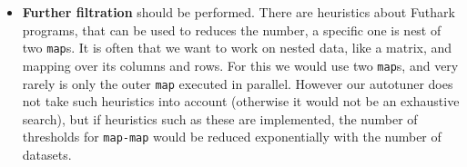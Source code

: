 \begin{itemize}
	\item \textbf{Further filtration} should be performed. There are heuristics
    about Futhark programs, that can be used to reduces the number, a specific
    one is nest of two \texttt{map}s. It is often that we want to work on
    nested data, like a matrix, and mapping over its columns and rows. For this
    we would use two \texttt{map}s, and very rarely is only the outer
    \texttt{map} executed in parallel. However our autotuner does not take such
    heuristics into account (otherwise it would not be an exhaustive search),
    but if heuristics such as these are implemented, the number of thresholds
    for \texttt{map-map} would be reduced exponentially with the number of
    datasets.
\end{itemize}

